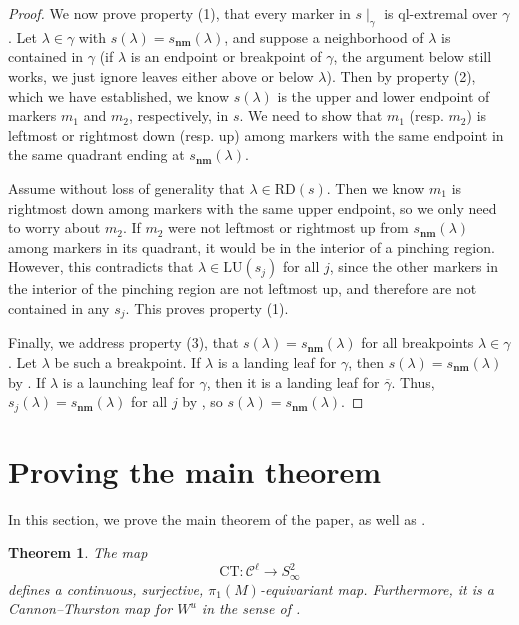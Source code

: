 \documentclass[11pt]{amsart}
\renewcommand{\l}{\lambda}
\newcommand{\mc}{\mathcal}
\newcommand{\lu}{\mathrm{LU}}
\newcommand{\rd}{\mathrm{RD}}
\newcommand{\ct}{\mathrm{CT}}
\newcommand{\snm}{s_\mathbf{nm}}
\numberwithin{equation}{section}
\newtheorem{theorem}[equation]{Theorem}
\theoremstyle{definition}
\begin{document}
\begin{proof}
	We now prove property (1), that every marker in $s\mid_\gamma$ is ql-extremal over $\gamma$. Let $\l\in\gamma$ with $s(\l)=\snm(\l)$, and suppose a neighborhood of $\l$ is contained in $\gamma$ (if $\l$ is an endpoint or breakpoint of $\gamma$, the argument below still works, we just ignore leaves either above or below $\l$). Then by property (2), which we have established, we know $s(\l)$ is the upper and lower endpoint of markers $m_1$ and $m_2$, respectively, in $s$. We need to show that $m_1$ (resp. $m_2$) is leftmost or rightmost down (resp. up) among markers with the same endpoint in the same quadrant ending at $\snm(\l)$.
	
	Assume without loss of generality that $\l\in\rd(s)$. Then we know $m_1$ is rightmost down among markers with the same upper endpoint, so we only need to worry about $m_2$. If $m_2$ were not leftmost or rightmost up from $\snm(\l)$ among markers in its quadrant, it would be in the interior of a pinching region. However, this contradicts that $\l\in\lu(s_j)$ for all $j$, since the other markers in the interior of the pinching region are not leftmost up, and therefore are not contained in any $s_j$. This proves property (1).
	
	Finally, we address property (3), that $s(\l)=\snm(\l)$ for all breakpoints $\l\in\gamma$. Let $\l$ be such a breakpoint. If $\l$ is a landing leaf for $\gamma$, then $s(\l)=\snm(\l)$ by . If $\l$ is a launching leaf for $\gamma$, then it is a landing leaf for $\overline{\gamma}$. Thus, $s_j(\l)=\snm(\l)$ for all $j$ by , so $s(\l)=\snm(\l)$.
\end{proof}

\section{Proving the main theorem}\label{sec:thm_proof}
In this section, we prove the main theorem of the paper, as well as .

\begin{theorem}\label{thm:ct}
	The map
	\[
	\ct\colon \mc C^\ell\to S^2_\infty
	\]
	defines a continuous, surjective, $\pi_1(M)$-equivariant map. Furthermore, it is a Cannon--Thurston map for $W^u$ in the sense of .
\end{theorem}
\end{document}

